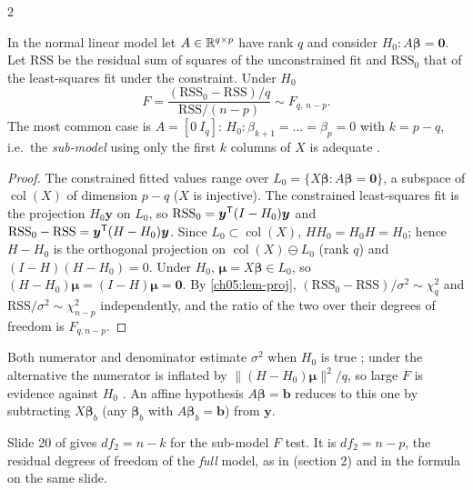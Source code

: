 \begin{paracol}{2}
\begin{theorem}\label{ch05:thm-F}
In the normal linear model let $A\in\mathbb{R}^{q\times p}$ have rank $q$ and consider $H_0:A\bm\beta=\bm 0$. Let RSS be the
residual sum of squares of the unconstrained fit and $\text{RSS}_0$ that of the least-squares fit under the
constraint. Under $H_0$
\[
  F=\frac{(\text{RSS}_0-\text{RSS})/q}{\text{RSS}/(n-p)}\sim F_{q,\,n-p}.
\]
The most common case is $A=[0\ I_q]$: $H_0:\beta_{k+1}=\dots=\beta_p=0$ with $k=p-q$, i.e.\ the \emph{sub-model} using
only the first $k$ columns of $X$ is adequate  .
\end{theorem}
\begin{proof}
The constrained fitted values range over $L_0=\{X\bm\beta:A\bm\beta=\bm 0\}$, a subspace of $\operatorname{col}(X)$ of dimension $p-q$
($X$ is injective). The constrained least-squares fit is the projection $H_0\bm y$ on $L_0$, so
$\text{RSS}_0=\bm y^{\mathsf T}(I-H_0)\bm y$ and $\text{RSS}_0-\text{RSS}=\bm y^{\mathsf T}(H-H_0)\bm y$. Since $L_0\subset\operatorname{col}(X)$, $HH_0=H_0H=H_0$; hence
$H-H_0$ is the orthogonal projection on $\operatorname{col}(X)\ominus L_0$ (rank $q$) and $(I-H)(H-H_0)=0$. Under $H_0$,
$\bm\mu=X\bm\beta\in L_0$, so $(H-H_0)\bm\mu=(I-H)\bm\mu=\bm 0$. By \cref{ch05:lem-proj}, $(\text{RSS}_0-\text{RSS})/\sigma^2\sim\chi^2_q$ and
$\text{RSS}/\sigma^2\sim\chi^2_{n-p}$ independently, and the ratio of the two over their degrees of freedom is $F_{q,n-p}$.
\end{proof}
Both numerator and denominator estimate $\sigma^2$ when $H_0$ is true ; under the alternative the
numerator is inflated by $\|(H-H_0)\bm\mu\|^2/q$, so large $F$ is evidence against $H_0$ . An affine
hypothesis $A\bm\beta=\bm b$ reduces to this one by subtracting $X\bm\beta_b$ (any $\bm\beta_b$ with $A\bm\beta_b=\bm b$) from $\bm y$.

\begin{coursenote}
Slide 20 of  gives $df_2=n-k$ for the sub-model $F$ test. It is $df_2=n-p$, the residual degrees of
freedom of the \emph{full} model, as in  (section 2) and in the formula on the same slide.
\end{coursenote}


\end{paracol}

